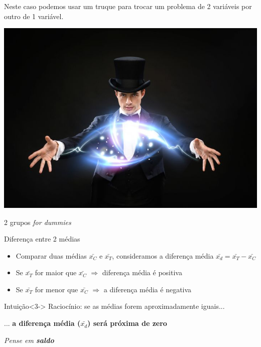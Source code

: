 \documentclass{beamer}
\begin{document}
\begin{frame}{\scriptsize }
  \begin{block}{}
    \large
    Neste caso podemos usar um truque para \alert{trocar} um problema de 2 variáveis por outro de 1 variável.
  \end{block}
  \bigskip
  \bigskip
  \begin{center}
    \includegraphics[width=.6\textwidth]{Cap7/magic}
  \end{center}
\end{frame}

\begin{frame}{\scriptsize 2 grupos {\em for dummies} \textregistered}
  \begin{block}{Diferença entre 2 médias}
    \begin{itemize}
      \scriptsize
    \item Comparar duas médias $\bar{x_C}$ e $\bar{x_T}$, consideramos a diferença média $\bar{x_d} = \bar{x_T} - \bar{x_C}$
    \item<2-> Se $\bar{x_T}$ for maior que $\bar{x_C}$  $\Rightarrow$ diferença média é positiva
    \item<2-> Se $\bar{x_T}$ for menor que $\bar{x_C}$  $\Rightarrow$ a diferença média é negativa
    \end{itemize}
  \end{block}
  \begin{block}{Intuição}<3->
    Raciocínio: se as médias forem aproximadamente iguais...

    \bigskip
    ... {\bf a diferença média ($\bar{x_d}$) será próxima de zero}
  \end{block}
  \bigskip
  \begin{center}
    \footnotesize
    {\em Pense em \alert{\bf saldo}}
  \end{center}
\end{frame}
\end{document}

